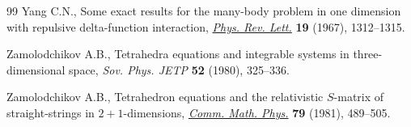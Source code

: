 \begin{thebibliography}{99}
Yang C.N., Some exact results for the many-body problem in one dimension with
 repulsive delta-function interaction,
 \href{https://doi.org/10.1103/PhysRevLett.19.1312}{\textit{Phys. Rev. Lett.}}
 \textbf{19} (1967), 1312--1315.

Zamolodchikov A.B., Tetrahedra equations and integrable systems in
 three-dimensional space, \textit{Sov. Phys. JETP} \textbf{52} (1980),
 325--336.

Zamolodchikov A.B., Tetrahedron equations and the relativistic {$S$}-matrix of
 straight-strings in {$2+1$}-dimensions,
 \href{https://doi.org/10.1007/BF01209309}{\textit{Comm. Math. Phys.}}
 \textbf{79} (1981), 489--505.

\end{thebibliography}
